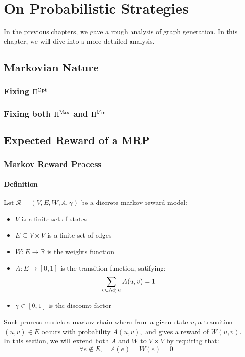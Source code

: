 \chapter{On Probabilistic Strategies}
\label{appendix:Probabilistic:Strategies}
In the previous chapters, we gave a rough analysis of graph generation.
\newline In this chapter, we will dive into a more detailed analysis.

\section{Markovian Nature}
\subsection{Fixing $\Pi^{\operatorname{Opt}}$}
\subsection{Fixing both $\Pi^{\operatorname{Max}}$ and $\Pi^{\operatorname{Min}}$}
\label{section:ProbabilisticStrategies:MRP}


\section{Expected Reward of a MRP}
\subsection{Markov Reward Process}
\subsubsection{Definition}
Let $\mathcal{R}=(V,E,W,A,\gamma)$ be a discrete markov reward model:
\begin{itemize}
	\item $V$ is a finite set of states
	\item $E\subseteq V\times V$ is a finite set of edges
	\item $W:E\rightarrow \mathbb{R}$ is the weights function
	\item  $A:E\rightarrow [0,1]$ is the transition function, satifying:
	\begin{align}
		\sum_{v\in\operatorname{Adj} u} A(u,v) &= 1 
	\end{align}
	\item $\gamma\in [0,1]$ is the discount factor
\end{itemize}
Such process models a markov chain where from a given state $u$, a transition $(u,v)\in E$ occurs with probability $A(u,v),$ and gives a reward of $W(u,v).$
\newline 
In this section, we will extend both $A$ and $W$ to $V\times V$ by requiring that:
$$
\forall e \notin E, \quad A(e)=W(e)=0
$$
